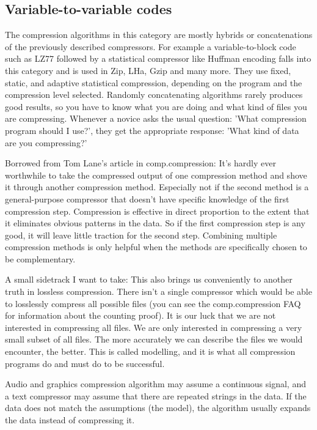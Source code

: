 \begin{frame}
\subsection*{Variable-to-variable codes}

The compression algorithms in this category are mostly hybrids or concatenations of the previously described compressors. 
For example a variable-to-block code such as LZ77 followed by a statistical compressor like Huffman encoding falls into this category and is used in Zip, LHa, Gzip and many more. They use fixed, static, and adaptive statistical compression, depending on the program and the compression level selected.
Randomly concatenating algorithms rarely produces good results, so you have to know what you are doing and what kind of files you are compressing. 
Whenever a novice asks the usual question: 'What compression program should I use?', they get the appropriate response: 'What kind of data are you compressing?'

Borrowed from Tom Lane's article in comp.compression:
It's hardly ever worthwhile to take the compressed output of one compression method and shove it through another compression method. 
Especially not if the second method is a general-purpose compressor that doesn't have specific knowledge of the first compression step. Compression is effective in direct proportion to the extent that it eliminates obvious patterns in the data. So if the first compression step is any good, it will leave little traction for the second step. Combining multiple compression methods is only helpful when the methods are specifically chosen to be complementary.

A small sidetrack I want to take:
This also brings us conveniently to another truth in lossless compression. 
There isn't a single compressor which would be able to losslessly compress all possible files (you can see the comp.compression FAQ for information about the counting proof). It is our luck that we are not interested in compressing all files. We are only interested in compressing a very small subset of all files. The more accurately we can describe the files we would encounter, the better. This is called modelling, and it is what all compression programs do and must do to be successful.

Audio and graphics compression algorithm may assume a continuous signal, and a text compressor may assume that there are 
repeated strings in the data. If the data does not match the assumptions (the model), the algorithm usually expands the data instead of compressing it.


\end{frame}
